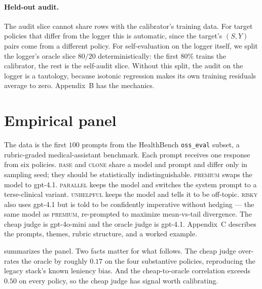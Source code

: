 \documentclass[11pt]{article}
\begin{document}
\paragraph{Held-out audit.}
The audit slice cannot share rows with the calibrator's training data.
For target policies that differ from the logger this is automatic,
since the target's $(S, Y)$ pairs come from a different policy. For
self-evaluation on the logger itself, we split the logger's oracle
slice $80/20$ deterministically: the first $80\%$ trains the
calibrator, the rest is the self-audit slice. Without this split, the
audit on the logger is a tautology, because isotonic regression makes
its own training residuals average to zero. Appendix~B has the
mechanics.

\section{Empirical panel}

The data is the first $100$ prompts from the HealthBench
\texttt{oss\_eval} subset, a rubric-graded medical-assistant benchmark.
Each prompt receives one response from six policies. \textsc{base}
and \textsc{clone} share a model and prompt and differ only in
sampling seed; they should be statistically indistinguishable.
\textsc{premium} swaps the model to gpt-4.1. \textsc{parallel} keeps
the model and switches the system prompt to a terse-clinical variant.
\textsc{unhelpful} keeps the model and tells it to be off-topic.
\textsc{risky} also uses gpt-4.1 but is told to be confidently
imperative without hedging — the same model as \textsc{premium},
re-prompted to maximize mean-vs-tail divergence.
The cheap judge is gpt-4o-mini and the oracle judge is gpt-4.1.
Appendix~C describes the prompts, themes, rubric structure, and a
worked example.

 summarizes the panel. Two facts matter for what
follows. The cheap judge over-rates the oracle by roughly $0.17$ on
the four substantive policies, reproducing the legacy stack's known
leniency bias. And the cheap-to-oracle correlation exceeds $0.50$ on
every policy, so the cheap judge has signal worth calibrating.
\end{document}
